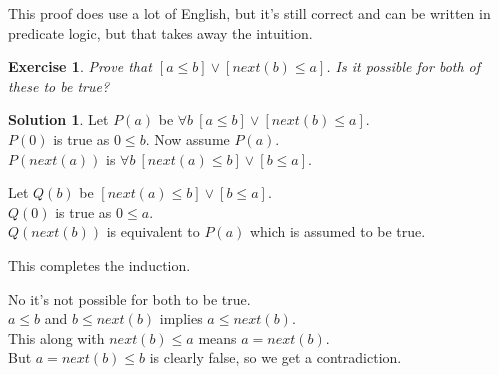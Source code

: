\documentclass[a4paper,10pt]{article}
\newtheorem{exercise}{Exercise}[section]
\theoremstyle{definition} %
\newtheorem*{solution}{Solution}
\begin{document}
    This proof does use a lot of English, but it's still correct and can be written in predicate
    logic, but that takes away the intuition.

    \begin{exercise}
        Prove that $[a \leq b] \lor [next(b) \leq a]$. Is it possible for both of these to be true?
    \end{exercise}

    \begin{solution}
        Let $P(a)$ be $\forall b \ [a \leq b] \lor [next(b) \leq a]$. \\
        $P(0)$ is true as $0 \leq b$. Now assume $P(a)$. \\
        $P(next(a))$ is $\forall b \ [next(a) \leq b] \lor [b \leq a]$.
        \begin{adjustwidth}{1cm}{0cm}
            Let $Q(b)$ be $[next(a) \leq b] \lor [b \leq a]$. \\
            $Q(0)$ is true as $0 \leq a$. \\
            $Q(next(b))$ is equivalent to $P(a)$ which is assumed to be true.
        \end{adjustwidth}
        This completes the induction.

        No it's not possible for both to be true. \\
        $a \leq b$ and $b \leq next(b)$ implies $a \leq next(b)$. \\
        This along with $next(b) \leq a$ means $a = next(b)$. \\
        But $a = next(b) \leq b$ is clearly false, so we get a contradiction.
    \end{solution}
\end{document}
